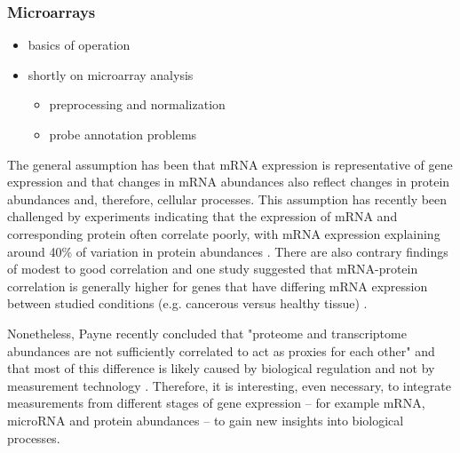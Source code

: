 \subsubsection{Microarrays}

\begin{itemize}
  \item basics of operation
  \item shortly on microarray analysis
  \begin{itemize}
    \item preprocessing and normalization
    \item probe annotation problems
  \end{itemize}
\end{itemize}


The general assumption has been that mRNA expression is representative of gene
expression and that changes in mRNA abundances also reflect changes in protein
abundances and, therefore, cellular processes. This assumption has recently
been challenged by experiments indicating that the expression of mRNA and
corresponding protein often correlate poorly, with mRNA expression
explaining around 40\% of variation in protein abundances \citep{Vogel2012}.
There are also contrary findings of modest to good correlation
and one study suggested that mRNA-protein correlation is generally higher for
genes that have differing mRNA expression between studied conditions
(e.g. cancerous versus healthy tissue) \citep{Koussounadis2015}.

Nonetheless, Payne recently concluded that "proteome and transcriptome abundances are not
sufficiently correlated to act as proxies for each other" and that
most of this difference is likely caused by biological regulation and not
by measurement technology \cite{Payne2015}.
Therefore, it is interesting, even necessary, to integrate
measurements from different stages of gene expression -- for example
mRNA, microRNA and protein abundances -- to gain new insights
into biological processes.
